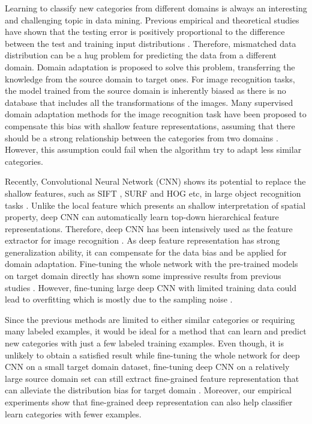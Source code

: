 ﻿Learning to classify new categories from different domains is always an interesting and challenging topic in data mining.
Previous empirical and theoretical studies have shown that the testing error is positively proportional to the difference between the test and training input distributions \cite{ben2007analysis} \cite{blitzer2008learning}. Therefore, mismatched data distribution can be a hug problem for predicting the data from a different domain. Domain adaptation is proposed to solve this problem, transferring the knowledge from the source domain to target ones. For image recognition tasks, the model trained from the source domain is inherently biased as there is no database that includes all the transformations of the images. Many supervised domain adaptation methods for the image recognition task have been proposed to compensate this bias with shallow feature representations, assuming that there should be a strong relationship between the categories from two domains \cite{daume2009frustratingly} \cite{yang2007adapting} \cite{aytar2011tabula}. However, this assumption could fail when the algorithm try to adapt less similar categories.

Recently, Convolutional Neural Network (CNN) shows its potential to replace the shallow features, such as SIFT \cite{lowe1999object}, SURF \cite{bay2006surf} and HOG \cite{dalal2005histograms} etc, in large object recognition tasks \cite{krizhevsky2012imagenet} \cite{zeiler2014visualizing} \cite{simonyan2014very}. Unlike the local feature which presents an shallow interpretation of spatial property, deep CNN can automatically learn top-down hierarchical feature representations. Therefore, deep CNN has been intensively used as the feature extractor for image recognition \cite{farabet2013learning}. As deep feature representation has strong generalization ability, it can compensate for the data bias and be applied for domain adaptation. Fine-tuning the whole network with the pre-trained models on target domain directly has shown some impressive results from previous studies \cite{Chatfield14} \cite{zeiler2014visualizing} \cite{hoffman2013one} \cite{NIPS2014_Zhou}.
However, fine-tuning large deep CNN with limited training data could lead to overfitting which is mostly due to the sampling noise \cite{srivastava2014dropout}.

Since the previous methods are limited to either similar categories or requiring many labeled examples, it would be ideal for a method that can learn and predict new categories with just a few labeled training examples. Even though, it is unlikely to obtain a satisfied result while fine-tuning the whole network for deep CNN on a small target domain dataset, fine-tuning deep CNN on a relatively large source domain set can still extract fine-grained feature representation that can alleviate the distribution bias for target domain \cite{zhang2014part}. Moreover, our empirical experiments show that fine-grained deep representation can also help classifier learn categories with fewer examples.


